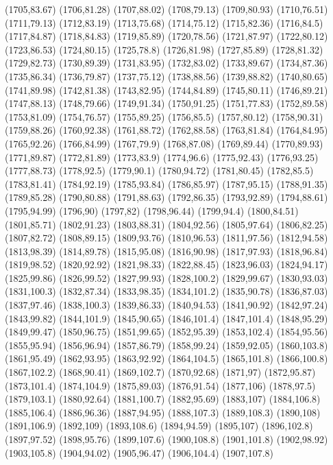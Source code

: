 (1705,83.67)
(1706,81.28)
(1707,88.02)
(1708,79.13)
(1709,80.93)
(1710,76.51)
(1711,79.13)
(1712,83.19)
(1713,75.68)
(1714,75.12)
(1715,82.36)
(1716,84.5)
(1717,84.87)
(1718,84.83)
(1719,85.89)
(1720,78.56)
(1721,87.97)
(1722,80.12)
(1723,86.53)
(1724,80.15)
(1725,78.8)
(1726,81.98)
(1727,85.89)
(1728,81.32)
(1729,82.73)
(1730,89.39)
(1731,83.95)
(1732,83.02)
(1733,89.67)
(1734,87.36)
(1735,86.34)
(1736,79.87)
(1737,75.12)
(1738,88.56)
(1739,88.82)
(1740,80.65)
(1741,89.98)
(1742,81.38)
(1743,82.95)
(1744,84.89)
(1745,80.11)
(1746,89.21)
(1747,88.13)
(1748,79.66)
(1749,91.34)
(1750,91.25)
(1751,77.83)
(1752,89.58)
(1753,81.09)
(1754,76.57)
(1755,89.25)
(1756,85.5)
(1757,80.12)
(1758,90.31)
(1759,88.26)
(1760,92.38)
(1761,88.72)
(1762,88.58)
(1763,81.84)
(1764,84.95)
(1765,92.26)
(1766,84.99)
(1767,79.9)
(1768,87.08)
(1769,89.44)
(1770,89.93)
(1771,89.87)
(1772,81.89)
(1773,83.9)
(1774,96.6)
(1775,92.43)
(1776,93.25)
(1777,88.73)
(1778,92.5)
(1779,90.1)
(1780,94.72)
(1781,80.45)
(1782,85.5)
(1783,81.41)
(1784,92.19)
(1785,93.84)
(1786,85.97)
(1787,95.15)
(1788,91.35)
(1789,85.28)
(1790,80.88)
(1791,88.63)
(1792,86.35)
(1793,92.89)
(1794,88.61)
(1795,94.99)
(1796,90)
(1797,82)
(1798,96.44)
(1799,94.4)
(1800,84.51)
(1801,85.71)
(1802,91.23)
(1803,88.31)
(1804,92.56)
(1805,97.64)
(1806,82.25)
(1807,82.72)
(1808,89.15)
(1809,93.76)
(1810,96.53)
(1811,97.56)
(1812,94.58)
(1813,98.39)
(1814,89.78)
(1815,95.08)
(1816,90.98)
(1817,97.93)
(1818,96.84)
(1819,98.52)
(1820,92.92)
(1821,98.33)
(1822,88.45)
(1823,96.03)
(1824,94.17)
(1825,99.86)
(1826,99.52)
(1827,99.93)
(1828,100.2)
(1829,99.67)
(1830,93.03)
(1831,100.3)
(1832,87.34)
(1833,98.35)
(1834,101.2)
(1835,90.78)
(1836,87.03)
(1837,97.46)
(1838,100.3)
(1839,86.33)
(1840,94.53)
(1841,90.92)
(1842,97.24)
(1843,99.82)
(1844,101.9)
(1845,90.65)
(1846,101.4)
(1847,101.4)
(1848,95.29)
(1849,99.47)
(1850,96.75)
(1851,99.65)
(1852,95.39)
(1853,102.4)
(1854,95.56)
(1855,95.94)
(1856,96.94)
(1857,86.79)
(1858,99.24)
(1859,92.05)
(1860,103.8)
(1861,95.49)
(1862,93.95)
(1863,92.92)
(1864,104.5)
(1865,101.8)
(1866,100.8)
(1867,102.2)
(1868,90.41)
(1869,102.7)
(1870,92.68)
(1871,97)
(1872,95.87)
(1873,101.4)
(1874,104.9)
(1875,89.03)
(1876,91.54)
(1877,106)
(1878,97.5)
(1879,103.1)
(1880,92.64)
(1881,100.7)
(1882,95.69)
(1883,107)
(1884,106.8)
(1885,106.4)
(1886,96.36)
(1887,94.95)
(1888,107.3)
(1889,108.3)
(1890,108)
(1891,106.9)
(1892,109)
(1893,108.6)
(1894,94.59)
(1895,107)
(1896,102.8)
(1897,97.52)
(1898,95.76)
(1899,107.6)
(1900,108.8)
(1901,101.8)
(1902,98.92)
(1903,105.8)
(1904,94.02)
(1905,96.47)
(1906,104.4)
(1907,107.8)
